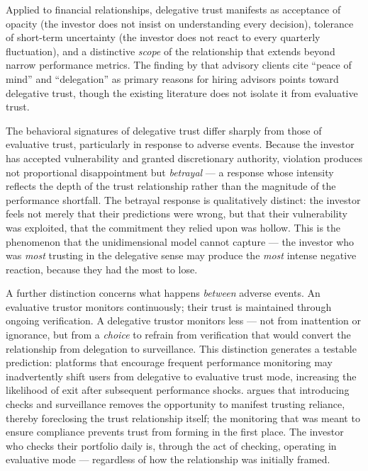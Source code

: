 Applied to financial relationships, delegative trust manifests as acceptance of opacity (the investor does not insist on understanding every decision), tolerance of short-term uncertainty (the investor does not react to every quarterly fluctuation), and a distinctive \textit{scope} of the relationship that extends beyond narrow performance metrics. The finding by \citet{RossiUtkus2020} that advisory clients cite ``peace of mind'' and ``delegation'' as primary reasons for hiring advisors points toward delegative trust, though the existing literature does not isolate it from evaluative trust.

The behavioral signatures of delegative trust differ sharply from those of evaluative trust, particularly in response to adverse events. Because the investor has accepted vulnerability and granted discretionary authority, violation produces not proportional disappointment but \textit{betrayal} --- a response whose intensity reflects the depth of the trust relationship rather than the magnitude of the performance shortfall. The betrayal response is qualitatively distinct: the investor feels not merely that their predictions were wrong, but that their vulnerability was exploited, that the commitment they relied upon was hollow. This is the phenomenon that the unidimensional model cannot capture --- the investor who was \textit{most} trusting in the delegative sense may produce the \textit{most} intense negative reaction, because they had the most to lose.

A further distinction concerns what happens \textit{between} adverse events. An evaluative trustor monitors continuously; their trust is maintained through ongoing verification. A delegative trustor monitors less --- not from inattention or ignorance, but from a \textit{choice} to refrain from verification that would convert the relationship from delegation to surveillance. This distinction generates a testable prediction: platforms that encourage frequent performance monitoring may inadvertently shift users from delegative to evaluative trust mode, increasing the likelihood of exit after subsequent performance shocks. \citet{Pettit1995} argues that introducing checks and surveillance removes the opportunity to manifest trusting reliance, thereby foreclosing the trust relationship itself; the monitoring that was meant to ensure compliance prevents trust from forming in the first place. The investor who checks their portfolio daily is, through the act of checking, operating in evaluative mode --- regardless of how the relationship was initially framed.

